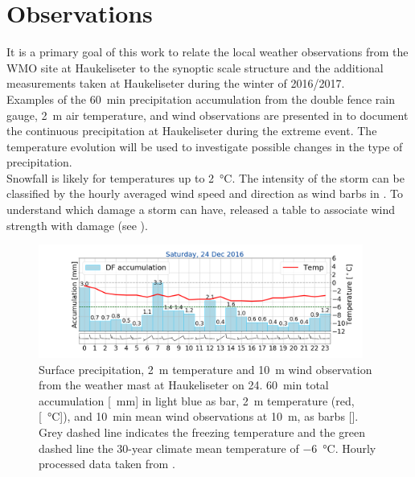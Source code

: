 \section{Observations}
\label{sec:loc_obs}
It is a primary goal of this work to relate the local weather observations from the WMO site at Haukeliseter to the synoptic scale structure and the additional measurements taken at Haukeliseter during the winter of 2016/2017.
\\
Examples of the \SI{60}{\minute} precipitation accumulation from the double fence rain gauge, \SI{2}{\metre} air temperature, and wind observations are presented in  to document the continuous precipitation at Haukeliseter during the extreme event. The temperature evolution will be used to investigate possible changes in the type of precipitation. 
\\
Snowfall is likely for temperatures up to \SI{2}{\celsius}. The intensity of the storm can be classified by the hourly averaged wind speed and direction as wind barbs in \SI{}{\mPs}.
To understand which damage a storm can have, \cite{faeraas_urd_2016} released a table to associate wind strength with damage (see ).
\begin{figure}[H]
	\centering
	\includegraphics[trim={4.9cm 1.cm 1.5cm 1cm},clip,
	width=0.95\textwidth]{./fig_weathermast/T_P_U_20161224}
	\caption{Surface precipitation, \SI{2}{\metre} temperature and \SI{10}{\metre} wind observation from the weather mast at Haukeliseter on \SI{24}{\dec}. \SI{60}{\minute} total accumulation [\SI{}{\mm}] in light blue as bar, \SI{2}{\metre} temperature (red, [\SI{}{\celsius}]), and \SI{10}{\minute} mean wind observations at \SI{10}{\metre}, as barbs [\SI{}{\mPs}]. Grey dashed line indicates the freezing temperature and the green dashed line the 30-year climate mean temperature of \SI{-6}{\celsius}. Hourly processed data taken from \cite{eklima_norwegian_2016}.} \label{fig:TPU24_pres}
\end{figure}
